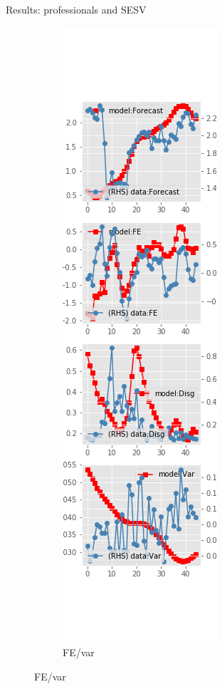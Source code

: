 \documentclass{beamer}
\begin{document}
\begin{frame}{Results: professionals and SESV}
\begin{figure}[ht]
\begin{subfigure}[b]{0.19\textwidth}
		\end{subfigure}
		\hfill
		\begin{subfigure}[b]{0.19\textwidth}
			\caption{FE/var}
			\includegraphics[width=\textwidth, height = 0.8\textheight]{figuresDraft/spf_se_est_sv_diag3.png}

\end{subfigure}
\end{figure}
\end{frame}
\end{document}
